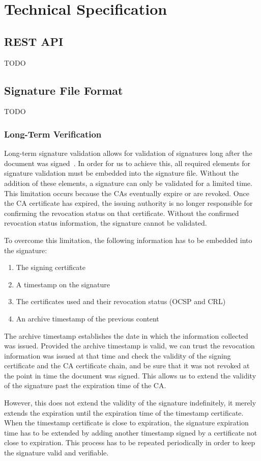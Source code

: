 \chapter{Technical Specification}
\section{REST API}
TODO
\section{Signature File Format}
TODO
\subsection{Long-Term Verification}
Long-term signature validation allows for validation of signatures long after the document was signed~\cite{etsipades}.
In order for us to achieve this, all required elements for signature validation must be embedded into the signature file.
Without the addition of these elements, a signature can only be validated for a limited time.
This limitation occurs because the \gls{CA}s eventually expire or are revoked.
Once the \gls{CA} certificate has expired, the issuing authority is no longer responsible for confirming the revocation status on that certificate.
Without the confirmed revocation status information, the signature cannot be validated.

To overcome this limitation, the following information has to be embedded into the signature:
\begin{enumerate}
    \item The signing certificate
    \item A timestamp on the signature
    \item The certificates used and their revocation status (\gls{OCSP} and \gls{CRL})
    \item An archive timestamp of the previous content
\end{enumerate}

The archive timestamp establishes the date in which the information collected was issued.
Provided the archive timestamp is valid,
we can trust the revocation information was issued at that time and check the validity of the signing certificate and the \gls{CA} certificate chain,
and be sure that it was not revoked at the point in time the document was signed.
This allows us to extend the validity of the signature past the expiration time of the \gls{CA}.

However, this does not extend the validity of the signature indefinitely,
it merely extends the expiration until the expiration time of the timestamp certificate.
When the timestamp certificate is close to expiration,
the signature expiration time has to be extended by adding another timestamp signed by a certificate not close to expiration.
This process has to be repeated periodically in order to keep the signature valid and verifiable.

